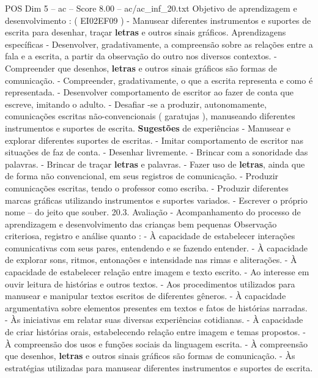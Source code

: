 \begin{textsample}{POS Dim 5 – ac – Score 8.00 – ac/ac\_inf\_20.txt}
Objetivo de aprendizagem e desenvolvimento : ( EI02EF09 ) - Manusear diferentes instrumentos e suportes de escrita para desenhar, traçar \textbf{letras} e outros sinais gráficos.
Aprendizagens específicas - Desenvolver, gradativamente, a compreensão sobre as relações entre a fala e a escrita, a partir da observação do outro nos diversos contextos. - Compreender que desenhos, \textbf{letras} e outros sinais gráficos são formas de comunicação. - Compreender, gradativamente, o que a escrita representa e como é representada. - Desenvolver comportamento de escritor ao fazer de conta que escreve, imitando o adulto. - Desafiar -se a produzir, autonomamente, comunicações escritas não-convencionais ( garatujas ), manuseando diferentes instrumentos e suportes de escrita. \textbf{Sugestões} de experiências - Manusear e explorar diferentes suportes de escritas. - Imitar comportamento de escritor nas situações de faz de conta. - Desenhar livremente. - Brincar com a sonoridade das palavras. - Brincar de traçar \textbf{letras} e palavras. - Fazer uso de \textbf{letras}, ainda que de forma não convencional, em seus registros de comunicação. - Produzir comunicações escritas, tendo o professor como escriba. - Produzir diferentes marcas gráficas utilizando instrumentos e suportes variados. - Escrever o próprio nome – do jeito que souber. 20.3.
Avaliação - Acompanhamento do processo de aprendizagem e desenvolvimento das crianças bem pequenas Observação criteriosa, registro e análise quanto : - À capacidade de estabelecer interações comunicativas com seus pares, entendendo e se fazendo entender. - À capacidade de explorar sons, ritmos, entonações e intensidade nas rimas e aliterações. - À capacidade de estabelecer relação entre imagem e texto escrito. - Ao interesse em ouvir leitura de histórias e outros textos. - Aos procedimentos utilizados para manusear e manipular textos escritos de diferentes gêneros. - À capacidade argumentativa sobre elementos presentes em textos e fatos de histórias narradas. - Às iniciativas em relatar suas diversas experiências cotidianas. - À capacidade de criar histórias orais, estabelecendo relação entre imagem e temas propostos. - À compreensão dos usos e funções sociais da linguagem escrita. - À compreensão que desenhos, \textbf{letras} e outros sinais gráficos são formas de comunicação. - Às estratégias utilizadas para manusear diferentes instrumentos e suportes de escrita.

\end{textsample}
